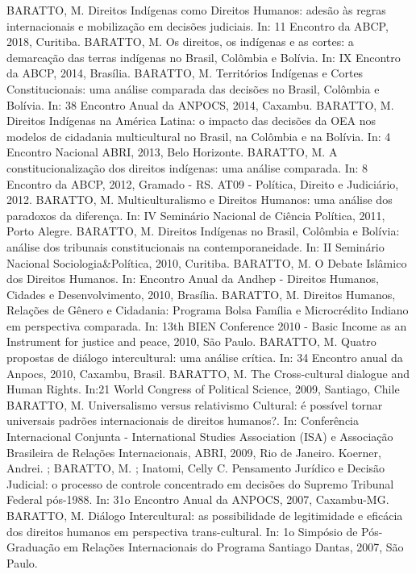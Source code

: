 \begin{cvcitems}
  \cvcitem
    {BARATTO, M.}
    {Direitos Indígenas como Direitos Humanos: adesão às regras internacionais e mobilização em decisões judiciais. In: 11 Encontro da ABCP, 2018, Curitiba.}
  \cvcitem
    {BARATTO, M.}
    {Os direitos, os indígenas e as cortes: a demarcação das terras indígenas no Brasil, Colômbia e Bolívia. In: IX Encontro da ABCP, 2014, Brasília.}
  \cvcitem
    {BARATTO, M.}
    {Territórios Indígenas e Cortes Constitucionais: uma análise comparada das decisões no Brasil, Colômbia e Bolívia. In: 38 Encontro Anual da ANPOCS, 2014, Caxambu.}
  \cvcitem
    {BARATTO, M.}
    {Direitos Indígenas na América Latina: o impacto das decisões da OEA nos modelos de cidadania multicultural no Brasil, na Colômbia e na Bolívia. In: 4 Encontro Nacional ABRI, 2013, Belo Horizonte.}
  \cvcitem
    {BARATTO, M.}
    {A constitucionalização dos direitos indígenas: uma análise comparada. In: 8 Encontro da ABCP, 2012, Gramado - RS. AT09 - Política, Direito e Judiciário, 2012.}
  \cvcitem
    {BARATTO, M.}
    {Multiculturalismo e Direitos Humanos: uma análise dos paradoxos da diferença. In: IV Seminário Nacional de Ciência Política, 2011, Porto Alegre.}
  \cvcitem
    {BARATTO, M.}
    {Direitos Indígenas no Brasil, Colômbia e Bolívia: análise dos tribunais constitucionais na contemporaneidade. In: II Seminário Nacional Sociologia\&Política, 2010, Curitiba.}
  \cvcitem
    {BARATTO, M.}
    {O Debate Islâmico dos Direitos Humanos. In: Encontro Anual da Andhep - Direitos Humanos, Cidades e Desenvolvimento, 2010, Brasília.}
  \cvcitem
    {BARATTO, M.}
    {Direitos Humanos, Relações de Gênero e Cidadania: Programa Bolsa Família e Microcrédito Indiano em perspectiva comparada. In: 13th BIEN Conference 2010 - Basic Income as an Instrument for justice and peace, 2010, São Paulo.}
  \cvcitem
    {BARATTO, M.}
    {Quatro propostas de diálogo intercultural: uma análise crítica. In: 34 Encontro anual da Anpocs, 2010, Caxambu, Brasil.}
  \cvcitem
    {BARATTO, M.}
    {The Cross-cultural dialogue and Human Rights. In:21 World Congress of Political Science, 2009, Santiago, Chile}
  \cvcitem
    {BARATTO, M.}
    {Universalismo versus relativismo Cultural: é possível tornar universais padrões internacionais de direitos humanos?. In: Conferência Internacional Conjunta - International Studies Association (ISA) e Associação Brasileira de Relações Internacionais, ABRI, 2009, Rio de Janeiro.}
  \cvcitem
    {Koerner, Andrei. ; BARATTO, M. ; Inatomi, Celly C.}
    {Pensamento Jurídico e Decisão Judicial: o processo de controle
    concentrado em decisões do Supremo Tribunal Federal pós-1988. In: 31o Encontro Anual da ANPOCS, 2007, Caxambu-MG.}
  \cvcitem
    {BARATTO, M.}
    {Diálogo Intercultural: as possibilidade de legitimidade e eficácia dos direitos humanos em perspectiva trans-cultural. In: 1o Simpósio de Pós-Graduação em Relações Internacionais do Programa Santiago Dantas, 2007, São Paulo.}
\end{cvcitems}

